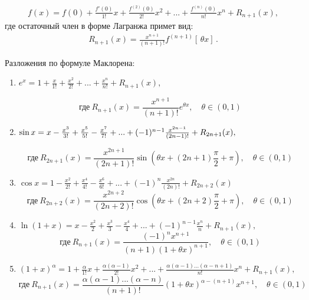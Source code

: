 \begin{align}\label{Makloren}
    f(x) = f(0) + \frac{f'(0)}{1!}x + \frac{f^{(2)}(0)}{2!}x^2 + ... + \frac{f^{(n)}(0)}{n!}x^n + R_{n+1}(x),
\end{align}
где остаточный член в форме Лагранжа примет вид:
\begin{align*}
     R_{n+1}(x) = \frac{x^{n+1}}{(n+1)!}f^{(n+1)}[\,\theta x]\,.
\end{align*}

Разложения по формуле Маклорена:
\begin{enumerate}
    \item
        $
            e^x = 1 + \frac{x}{1!} + \frac{x^2}{2!} + ... + \frac{x^n}{n!} + R_{n+1}(x), \
        $

        $$
           \text{где} \ R_{n+1}(x) = \frac{x^{n+1}}{(n+1)!}e^{\theta x}, \quad
            \theta \in (0,1)
        $$

    \item
        $
            \sin x = x - \frac{x^3}{3!} + \frac{x^5}{5!} - \frac{x^7}{7!} + ... + (-1)^{n-1}\frac{x^{2n-1}}{(2n-1)!} + R_{2n+1}(x), \\
        $

        $$
            \text{где} \ R_{2n+1}(x) = \frac{x^{2n+1}}{(2n+1)!} \sin(\theta x + (2n+1) \frac{\pi}{2} + \pi), \quad \theta \in (0,1)
        $$
    \item
        $
            \cos x = 1 - \frac{x^2}{2!} + \frac{x^4}{4!} - \frac{x^6}{6!} + ... + (-1)^{n}\frac{x^{2n}}{(2n)!} + R_{2n+2}(x)
        $
        $$
            \text{где} \ R_{2n+2}(x) = \frac{x^{2n+2}}{(2n+2)!} \cos(\theta x + (2n+2) \frac{\pi}{2} + \pi), \quad \theta \in (0,1)
        $$
    \item
        $
            \ln(1+x) = x - \frac{x^2}{2} + \frac{x^3}{3} - \frac{x^4}{4} + ... + (-1)^{n-1}\frac{x^n}{n} + R_{n+1}(x),
        $
        $$
            \text{где} \ R_{n+1}(x) = \frac{(-1)^n x^{n+1}}{(n+1)(1+\theta x)^{n+1}}, \quad \theta \in (0,1)
        $$
    \item
        $
            (1+x)^\alpha = 1 + \frac{\alpha}{1!}x + \frac{\alpha (\alpha - 1)}{2!}x^2 + ... + \frac{\alpha(\alpha-1)...(\alpha - n + 1)}{n!}x^n + R_{n+1}(x),
        $
        $$
            \text{где} \ R_{n+1}(x) = \frac{\alpha(\alpha - 1)...(\alpha - n)}{(n+1)!}(1+\theta x)^{\alpha - (n+1)}x^{n+1}, \quad \theta \in (0,1)
        $$
\end{enumerate}


